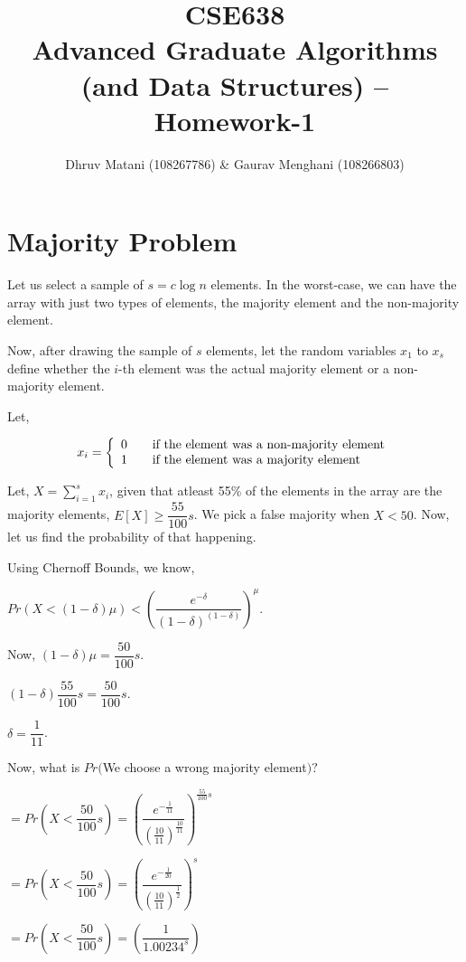 \documentclass{article}
\title{CSE638 \\ Advanced Graduate Algorithms (and Data Structures) -- Homework-1}
\author{Dhruv Matani (108267786) \& Gaurav Menghani (108266803)}
\begin{document}
\maketitle

\clearpage

\tableofcontents

\clearpage

\section{Majority Problem}
Let us select a sample of $s = c\log{n}$ elements. In the worst-case, we can
have the array with just two types of elements, the majority element and the
non-majority element.

Now, after drawing the sample of $s$ elements, let the random variables
$x_{1}$ to $x_{s}$ define whether the $i$-th element was the actual majority
element or a non-majority element.

Let,

\[
  x_{i} = \left\{
  \begin{array}{l l}
    0 & \quad \text{if the element was a non-majority element}\\
    1 & \quad \text{if the element was a majority element}\\
  \end{array}
  \right.
\]

Let, $X = \displaystyle\sum\limits_{i=1}^s{x_{i}}$,
given that atleast 55\% of the elements in the array are the majority elements,
$E[X] \geq \dfrac{55}{100}s$. We pick a false majority when $X < 50$. Now,
let us find the probability of that happening.

Using Chernoff Bounds, we know,

$Pr(X < (1-\delta)\mu) < \left(\dfrac{e^{-\delta}}{(1-\delta)^{(1-\delta)}}\right)^\mu$.

Now, $(1-\delta)\mu = \dfrac{50}{100}s$.

$(1-\delta)\dfrac{55}{100}s = \dfrac{50}{100}s$.

$\delta = \dfrac{1}{11}$.

Now, what is $Pr($We choose a wrong majority element$)?$

$ = Pr(X < \dfrac{50}{100}s) = \left(\dfrac{e^{-\frac{1}{11}}}{(\frac{10}{11})^{\frac{10}{11}}}\right)^{\frac{55}{100}s}$

$ = Pr(X < \dfrac{50}{100}s) = \left(\dfrac{e^{-\frac{1}{20}}}{(\frac{10}{11})^{\frac{1}{2}}}\right)^s$

$ = Pr(X < \dfrac{50}{100}s) = \left(\dfrac{1}{1.00234^{s}}\right)$
\end{document}
